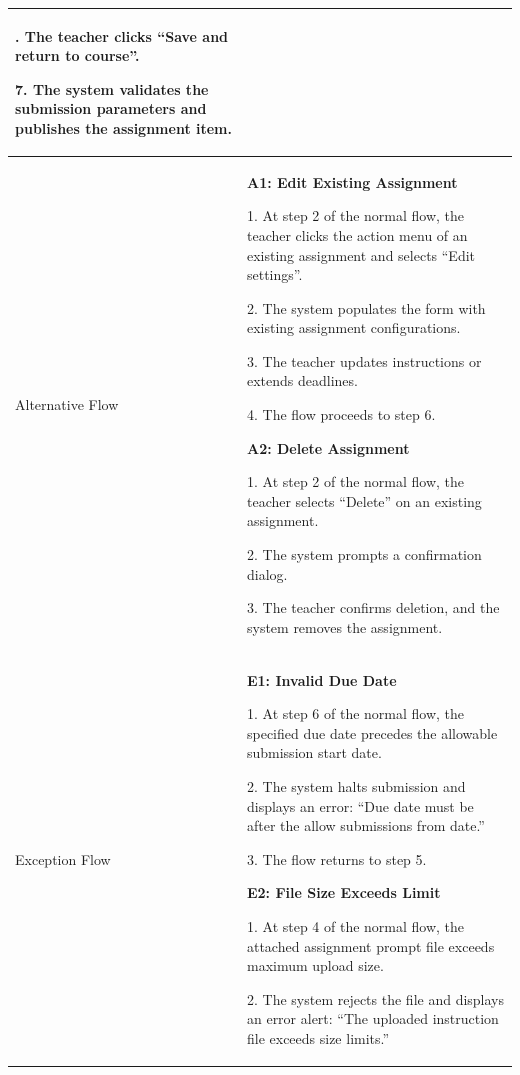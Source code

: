 {\begin{longtable}{|>{\bfseries\raggedright\arraybackslash}p{}|>{\raggedright\arraybackslash}p{}|}
6. The teacher clicks ``Save and return to course''. \par
7. The system validates the submission parameters and publishes the assignment item. \\ \hline
Alternative Flow &
\textbf{A1: Edit Existing Assignment} \par
1. At step 2 of the normal flow, the teacher clicks the action menu of an existing assignment and selects ``Edit settings''. \par
2. The system populates the form with existing assignment configurations. \par
3. The teacher updates instructions or extends deadlines. \par
4. The flow proceeds to step 6. \par\vspace{4pt}
\textbf{A2: Delete Assignment} \par
1. At step 2 of the normal flow, the teacher selects ``Delete'' on an existing assignment. \par
2. The system prompts a confirmation dialog. \par
3. The teacher confirms deletion, and the system removes the assignment. \\ \hline
Exception Flow &
\textbf{E1: Invalid Due Date} \par
1. At step 6 of the normal flow, the specified due date precedes the allowable submission start date. \par
2. The system halts submission and displays an error: ``Due date must be after the allow submissions from date.'' \par
3. The flow returns to step 5. \par\vspace{4pt}
\textbf{E2: File Size Exceeds Limit} \par
1. At step 4 of the normal flow, the attached assignment prompt file exceeds maximum upload size. \par
2. The system rejects the file and displays an error alert: ``The uploaded instruction file exceeds size limits.'' \\ \hline
\end{longtable}
}


